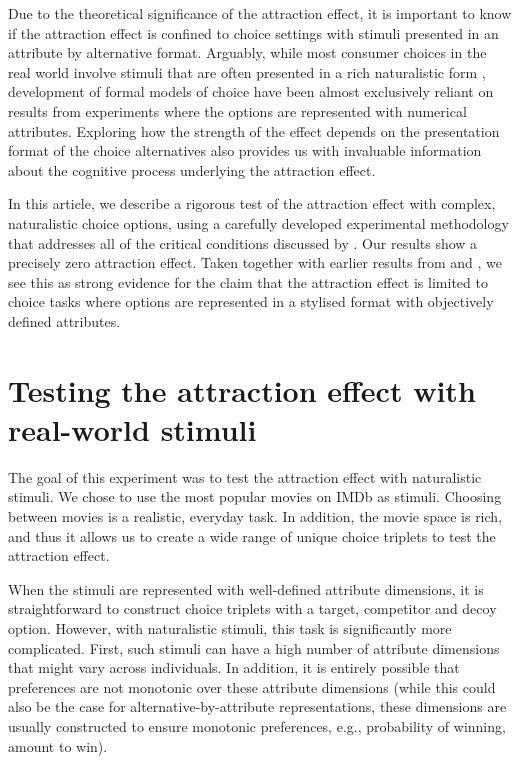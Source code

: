 \documentclass[12pt, a4paper]{article}
\begin{document}
Due to the theoretical significance of the attraction effect, it is important to know if the attraction effect is confined to choice settings with stimuli presented in an attribute by alternative format. Arguably, while most consumer choices in the real world involve stimuli that are often presented in a rich naturalistic form \cite{Bhatia2018b}, development of formal models of choice have been almost exclusively reliant on results from experiments where the options are represented with numerical attributes. Exploring how the strength of the effect depends on the presentation format of the choice alternatives also provides us with invaluable information about the cognitive process underlying the attraction effect. 


In this article, we describe a rigorous test of the attraction effect with complex, naturalistic choice options, using a carefully developed experimental methodology that addresses all of the critical conditions discussed by . Our results show a precisely zero attraction effect. Taken together with earlier results from  and , we see this as strong evidence for the claim that the attraction effect is limited to choice tasks where options are represented in a stylised format with objectively defined attributes.


\section*{Testing the attraction effect with real-world stimuli}

The goal of this experiment was to test the attraction effect with naturalistic stimuli. We chose to use the most popular movies on IMDb as stimuli. Choosing between movies is a realistic, everyday task. In addition, the movie space is rich, and thus it allows us to create a wide range of unique choice triplets to test the attraction effect.

When the stimuli are represented with well-defined attribute dimensions, it is straightforward to construct choice triplets with a target, competitor and decoy option. However, with naturalistic stimuli, this task is significantly more complicated. First, such stimuli can have a high number of attribute dimensions that might vary across individuals. In addition, it is entirely possible that preferences are not monotonic over these attribute dimensions (while this could also be the case for alternative-by-attribute representations, these dimensions are usually constructed to ensure monotonic preferences, e.g., probability of winning, amount to win).
\end{document}
